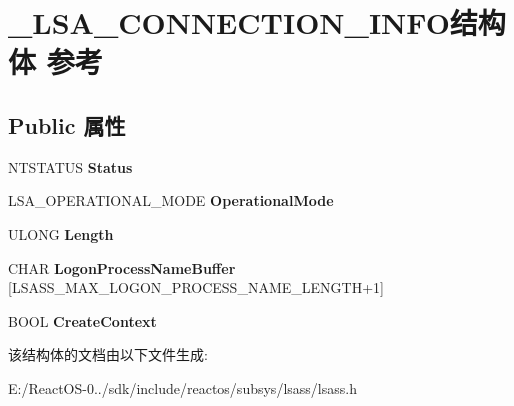 \hypertarget{struct___l_s_a___c_o_n_n_e_c_t_i_o_n___i_n_f_o}{}\section{\+\_\+\+L\+S\+A\+\_\+\+C\+O\+N\+N\+E\+C\+T\+I\+O\+N\+\_\+\+I\+N\+F\+O结构体 参考}
\label{struct___l_s_a___c_o_n_n_e_c_t_i_o_n___i_n_f_o}
\subsection*{Public 属性}
\begin{DoxyCompactItemize}
\item 
\mbox{\label{struct___l_s_a___c_o_n_n_e_c_t_i_o_n___i_n_f_o_ac34e431045b02fdbe0849b336f15a2b2}} 
N\+T\+S\+T\+A\+T\+US {\bfseries Status}
\item 
\mbox{\label{struct___l_s_a___c_o_n_n_e_c_t_i_o_n___i_n_f_o_a3bd467f828f0ec338a9cb838f5a687f4}} 
L\+S\+A\+\_\+\+O\+P\+E\+R\+A\+T\+I\+O\+N\+A\+L\+\_\+\+M\+O\+DE {\bfseries Operational\+Mode}
\item 
\mbox{\label{struct___l_s_a___c_o_n_n_e_c_t_i_o_n___i_n_f_o_a1a96ee7ccdfdf91ccd8a56911493852d}} 
U\+L\+O\+NG {\bfseries Length}
\item 
\mbox{\label{struct___l_s_a___c_o_n_n_e_c_t_i_o_n___i_n_f_o_af1191966941d847518a889c4f04f9ece}} 
C\+H\+AR {\bfseries Logon\+Process\+Name\+Buffer} \mbox{[}L\+S\+A\+S\+S\+\_\+\+M\+A\+X\+\_\+\+L\+O\+G\+O\+N\+\_\+\+P\+R\+O\+C\+E\+S\+S\+\_\+\+N\+A\+M\+E\+\_\+\+L\+E\+N\+G\+TH+1\mbox{]}
\item 
\mbox{\label{struct___l_s_a___c_o_n_n_e_c_t_i_o_n___i_n_f_o_a0b76d77e0139edc667d968d4d4df145d}} 
B\+O\+OL {\bfseries Create\+Context}
\end{DoxyCompactItemize}


该结构体的文档由以下文件生成\+:\begin{DoxyCompactItemize}
\item 
E\+:/\+React\+O\+S-\/0../sdk/include/reactos/subsys/lsass/lsass.\+h\end{DoxyCompactItemize}
